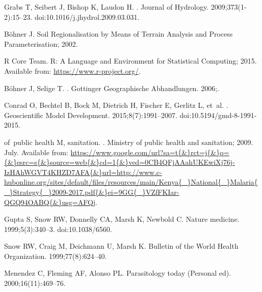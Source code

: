 \documentclass[10pt,letterpaper]{article}\usepackage[]{graphicx}\usepackage[]{color}
\begin{document}
\begin{thebibliography}{10}
Grabs T, Seibert J, Bishop K, Laudon H.
.
\newblock Journal of Hydrology. 2009;373(1-2):15--23.
\newblock doi:{10.1016/j.jhydrol.2009.03.031}.

B{\"{o}}hner J. {Soil Regionalisation by Means of Terrain Analysis and Process
  Parameterisation}; 2002.

{R Core Team}. {R: A Language and Environment for Statistical Computing}; 2015.
\newblock Available from: \url{https://www.r-project.org/}.

B{\"{o}}hner J, Selige T.
.
\newblock Gottinger Geographische Abhandlungen. 2006;.

Conrad O, Bechtel B, Bock M, Dietrich H, Fischer E, Gerlitz L, et~al.
.
\newblock Geoscientific Model Development. 2015;8(7):1991--2007.
\newblock doi:{10.5194/gmd-8-1991-2015}.

of~public health M, sanitation.
.
\newblock Ministry of public health and sanitation; 2009. July.
\newblock Available from:
  \url{https://www.google.com/url?sa=t{\&}rct=j{\&}q={\&}esrc=s{\&}source=web{\&}cd=1{\&}ved=0CB4QFjAAahUKEwiXj76j-IzHAhWGVT4KHZD7AFA{\&}url=http://www.c-hubonline.org/sites/default/files/resources/main/Kenya{\_}National{\_}Malaria{\_}Strategy{\_}2009-2017.pdf{\&}ei=9GG{\_}VZfFKIar-QGQ94OABQ{\&}usg=AFQj}.

Gupta S, Snow RW, Donnelly CA, Marsh K, Newbold C.
\newblock Nature medicine. 1999;5(3):340--3.
\newblock doi:{10.1038/6560}.

Snow RW, Craig M, Deichmann U, Marsh K.
\newblock Bulletin of the World Health Organization. 1999;77(8):624--40.

Menendez C, Fleming AF, Alonso PL.
\newblock Parasitology today (Personal ed). 2000;16(11):469--76.

\end{thebibliography}
\end{document}

